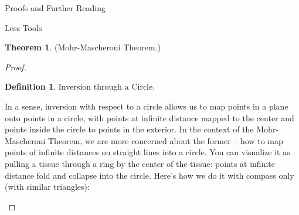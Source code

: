 \documentclass[12pt]{article}
\theoremstyle{definition}
\newtheorem{definition}{Definition}[section]
\theoremstyle{definition}
\theoremstyle{definition}
\newtheorem{theorem}{Theorem}[section]
\theoremstyle{definition}
\theoremstyle{definition}
\theoremstyle{definition}
\theoremstyle{definition}
\begin{document}
\begin{section}{Proofs and Further Reading}
\begin{subsection}{Less Tools}
\begin{theorem}{(Mohr-Mascheroni Theorem.)}
\begin{proof}
\begin{definition}{Inversion through a Circle.}
\begin{figure}[H]
                    \end{figure}
                \end{definition}
                In a sense, inversion with respect to a circle allows us to map points in a plane onto points in a circle, with points at 
                infinite distance mapped to the center and points inside the circle to points in the exterior. In the context of the Mohr-Mascheroni
                Theorem, we are more concerned about the former -- how to map points of infinite distances on straight lines into a circle. You can 
                visualize it as pulling a tissue through a ring by the center of the tissue: points at infinite distance fold and collapse into the circle.
                Here's how we do it with compass only (with similar triangles): \\
                \break
                \begin{figure}[H]
                    \centering
\end{figure}
\end{proof}
\end{theorem}
\end{subsection}
\end{section}
\end{document}
